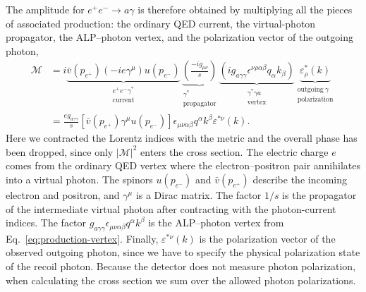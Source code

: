 \documentclass[12pt,a4paper]{article}
\begin{document}
The amplitude for $e^+e^-\to a\gamma$ is therefore obtained by multiplying all
the pieces of associated production: the ordinary QED current, the
virtual-photon propagator, the ALP--photon vertex, and the polarization vector
of the outgoing photon,
\begin{align}
    \mathcal{M}
    &=
    i
    \underbrace{\bar{v}(p_{e^+})(-ie\gamma^{\mu})u(p_{e^-})}
        _{\substack{e^+e^-\gamma^\ast\\ \mathrm{current}}}
    \underbrace{\left(\frac{-ig_{\mu \nu}}{s}\right)}
        _{\substack{\gamma^\ast\\ \mathrm{propagator}}}
    \underbrace{\left(ig_{a\gamma \gamma}\epsilon^{\nu \rho\alpha \beta}q_{\alpha}k_{\beta}\right)}
        _{\substack{\gamma^\ast\gamma a\\ \mathrm{vertex}}}
    \underbrace{\varepsilon ^{*}_{\rho}(k)}
        _{\substack{\mathrm{outgoing}\ \gamma\\ \mathrm{polarization}}}
    \nonumber\\
    &=
    \frac{eg_{a\gamma\gamma}}{s}
    \left[
      \bar v(p_{e^+})\gamma^\mu u(p_{e^-})
    \right]
    \epsilon_{\mu\nu\alpha\beta}
    q^\alpha k^\beta
    \varepsilon^{*\nu}(k).
    \label{eq:prod_amp}
\end{align}
Here we contracted the Lorentz indices with the metric and the overall phase
has been dropped, since only $|\mathcal{M}|^2$ enters the cross section. The
electric charge $e$ comes from the ordinary QED vertex where the
electron--positron pair annihilates into a virtual photon. The spinors
$u(p_{e^-})$ and $\bar v(p_{e^+})$ describe the incoming electron and positron,
and $\gamma^\mu$ is a Dirac matrix. The factor $1/s$ is the propagator of the
intermediate virtual photon after contracting with the photon-current indices.
The factor
$g_{a\gamma\gamma}\epsilon_{\mu\nu\alpha\beta}q^\alpha k^\beta$ is the
ALP--photon vertex from Eq.~\eqref{eq:production-vertex}. Finally,
$\varepsilon^{*\nu}(k)$ is the polarization vector of the observed outgoing
photon, since we have to specify the physical polarization state of the recoil
photon. Because the detector does not measure photon polarization, when
calculating the cross section we sum over the allowed photon polarizations.
\end{document}
